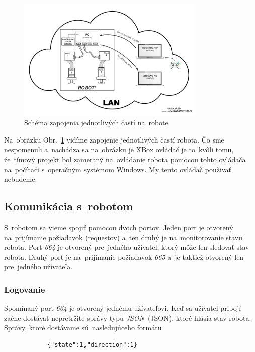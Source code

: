 \clearpage

\begin{figure}[!htbp]
	\begin{center}
		\includegraphics[width=9cm]{img/schemaRobota.png}
	\end{center}
	\caption{Schéma zapojenia jednotlivých častí na~robote}
	\label{fig:schemaRobota}
\end{figure}

Na~obrázku Obr.~\ref{fig:schemaRobota} vidíme zapojenie jednotlivých častí robota. Čo sme nespomenuli a~nachádza
sa na~obrázku je XBox ovládač je to~kvôli tomu, že~tímový projekt bol zameraný na~ovládanie robota pomocou tohto
ovládača na~počítači s~operačným systémom Windows. My tento ovládač použivať nebudeme.

\subsection{Komunikácia s~robotom}
\label{subsec:komunikacia}

S~robotom sa vieme spojiť pomocou dvoch portov. Jeden port je otvorený na~prijímanie požiadavok (requestov) a~ten
druhý je na~monitorovanie stavu robota. Port \textit{664} je otvorený pre~jedného užívateľ, ktorý môže len sledovať
stav robota. Druhý port je na~prijímanie požiadavok \textit{665} a~je taktiež otvorený len pre~jedného užívateľa.

\subsubsection{Logovanie}
\label{sec:logovanie}

	Spomínaný port \textit{664} je otvorený jednému užívateľovi. Keď sa užívateľ pripojí začne dostávať nepretržite
	správy typu \textit{JSON}~(\acrlong{JSON}), ktoré hlásia stav robota. Správy, ktoré dostávame sú~nasledujúceho
	formátu

	\begin{lstlisting}
			{"state":1,"direction":1}
	\end{lstlisting}


